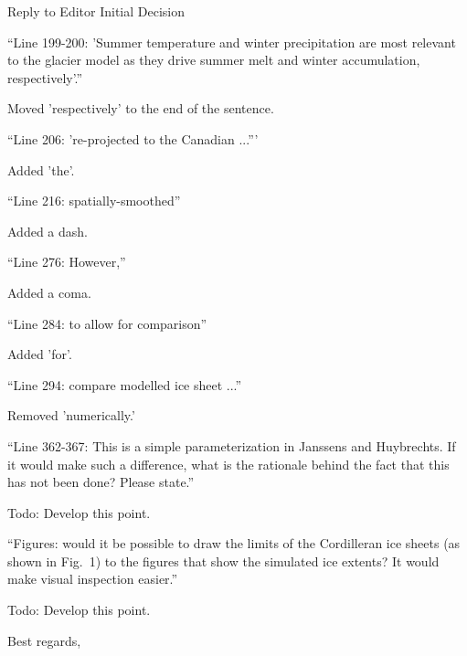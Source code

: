 \documentclass{letter}
\newcommand{\rev}[0]{\color{blue!50!black}\it}
\newcommand{\revpoint}[1]{{\rev\item``#1''}}
\newcommand{\todo}[1]{\textcolor{red!50!black}{Todo: #1}}
\begin{document}
\begin{letter}{Reply to Editor Initial Decision}
\begin{itemize}
\revpoint{Line 199-200: 'Summer temperature and winter precipitation are most relevant to the glacier model as they drive summer melt and winter accumulation, respectively'.}

Moved 'respectively' to the end of the sentence.

\revpoint{Line 206: 're-projected to the Canadian ...'}

Added 'the'.

\revpoint{Line 216: spatially-smoothed}

Added a dash.

\revpoint{Line 276: However,}

Added a coma.

\revpoint{Line 284: to allow for comparison}

Added 'for'.

\revpoint{Line 294: compare modelled ice sheet ...}

Removed 'numerically.'

\revpoint{Line 362-367: This is a simple parameterization in Janssens and Huybrechts. If it would make such a difference, what is the rationale behind the fact that this has not been done? Please state.}

\todo{Develop this point.}

\revpoint{Figures: would it be possible to draw the limits of the Cordilleran ice sheets (as shown in Fig.~1) to the figures that show the simulated ice extents? It would make visual inspection easier.}

\todo{Develop this point.}

\end{itemize}


\closing{Best regards,}

\end{letter}
\end{document}
